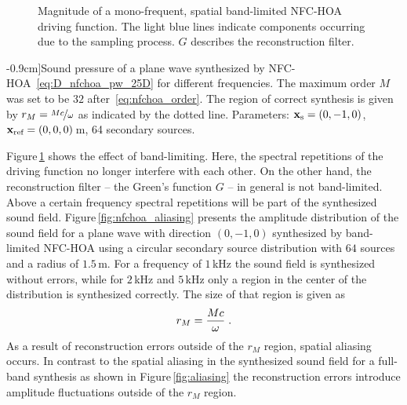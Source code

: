 \begin{figure}
    \small
    
    \caption{Magnitude of a mono-frequent, spatial band-limited \ac{NFC-HOA}
    driving function.
    The light blue lines
    indicate components occurring due to the sampling process. $G$ describes the
    reconstruction filter.
    }
    \label{fig:sampling_band_limited}
\end{figure}
%
\begin{figure*}[b]
    \small
    
    \caption[][-0.9cm]{Sound pressure of a plane wave synthesized by
    \ac{NFC-HOA}~\protect\eqref{eq:D_nfchoa_pw_25D} for different frequencies.
    The maximum order $M$ was set
    to be $32$ after~\protect\eqref{eq:nfchoa_order}. The region of correct synthesis is
    given by $r_M = \nicefrac{Mc}{\omega}$ as indicated by the dotted line.
    Parameters: $\mathbf{x}_\text{s} = (0,-1,0)$, $\mathbf{x}_\text{ref} = (0,0,0)$\,m, 64
    secondary sources.
    }
    \label{fig:nfchoa_aliasing}
\end{figure*}
%
Figure\,\ref{fig:sampling_band_limited} shows the effect of band-limiting.
Here, the spectral repetitions of the driving
function no longer interfere with each other. On the other hand, the reconstruction
filter -- the Green's function $G$ -- 
in general is not band-limited. Above a certain frequency spectral repetitions
will be part of the synthesized sound field. Figure\,\ref{fig:nfchoa_aliasing}
presents the amplitude distribution of the sound field for a plane wave with
direction $(0,-1,0)$ synthesized by
\twohalfD band-limited \ac{NFC-HOA} using a circular secondary source distribution with
$64$ sources and a radius of $1.5$\,m. For a frequency of $1$\,kHz the sound field
is synthesized without errors, while for $2$\,kHz and $5$\,kHz only a region in the
center of the distribution is synthesized correctly. The size of that region is
given as\autocite[Compare (9.1.31) and Fig.\,9.5 of][]{Gumerov2004}
%
\begin{equation}
    r_M = \frac{Mc}{\omega} \qp
    \label{eq:rM}
\end{equation}
%
As a result of reconstruction errors outside of the $r_M$ region, spatial aliasing occurs.
In contrast to the spatial aliasing in the synthesized sound field for a
full-band synthesis as shown in Figure\,\ref{fig:aliasing} the reconstruction errors
introduce amplitude fluctuations outside of the $r_M$ region.

